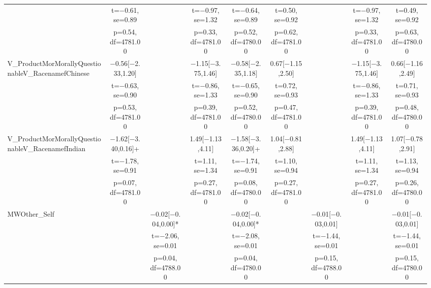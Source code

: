 \documentclass[]{report}
\begin{document}
\begin{table}
{\begin{tabular}[t]{lcccccccc}
		& t=\num{-0.61}, se=\num{0.89} &  & t=\num{-0.97}, se=\num{1.32} & t=\num{-0.64}, se=\num{0.89} & t=\num{0.50}, se=\num{0.92} &  & t=\num{-0.97}, se=\num{1.32} & t=\num{0.49}, se=\num{0.92}\\
		& p=\num{0.54}, df=\num{4781.00} &  & p=\num{0.33}, df=\num{4781.00} & p=\num{0.52}, df=\num{4780.00} & p=\num{0.62}, df=\num{4781.00} &  & p=\num{0.33}, df=\num{4781.00} & p=\num{0.63}, df=\num{4780.00}\\
		V\_ProductMorMorallyQuestionableV\_RacenamefChinese & \num{-0.56}[\num{-2.33},\num{1.20}] &  & \num{-1.15}[\num{-3.75},\num{1.46}] & \num{-0.58}[\num{-2.35},\num{1.18}] & \num{0.67}[\num{-1.15},\num{2.50}] &  & \num{-1.15}[\num{-3.75},\num{1.46}] & \num{0.66}[\num{-1.16},\num{2.49}]\\
		& t=\num{-0.63}, se=\num{0.90} &  & t=\num{-0.86}, se=\num{1.33} & t=\num{-0.65}, se=\num{0.90} & t=\num{0.72}, se=\num{0.93} &  & t=\num{-0.86}, se=\num{1.33} & t=\num{0.71}, se=\num{0.93}\\
		& p=\num{0.53}, df=\num{4781.00} &  & p=\num{0.39}, df=\num{4781.00} & p=\num{0.52}, df=\num{4780.00} & p=\num{0.47}, df=\num{4781.00} &  & p=\num{0.39}, df=\num{4781.00} & p=\num{0.48}, df=\num{4780.00}\\
		V\_ProductMorMorallyQuestionableV\_RacenamefIndian & \num{-1.62}[\num{-3.40},\num{0.16}]+ &  & \num{1.49}[\num{-1.13},\num{4.11}] & \num{-1.58}[\num{-3.36},\num{0.20}]+ & \num{1.04}[\num{-0.81},\num{2.88}] &  & \num{1.49}[\num{-1.13},\num{4.11}] & \num{1.07}[\num{-0.78},\num{2.91}]\\
		& t=\num{-1.78}, se=\num{0.91} &  & t=\num{1.11}, se=\num{1.34} & t=\num{-1.74}, se=\num{0.91} & t=\num{1.10}, se=\num{0.94} &  & t=\num{1.11}, se=\num{1.34} & t=\num{1.13}, se=\num{0.94}\\
		& p=\num{0.07}, df=\num{4781.00} &  & p=\num{0.27}, df=\num{4781.00} & p=\num{0.08}, df=\num{4780.00} & p=\num{0.27}, df=\num{4781.00} &  & p=\num{0.27}, df=\num{4781.00} & p=\num{0.26}, df=\num{4780.00}\\
		MWOther\_Self &  & \num{-0.02}[\num{-0.04},\num{0.00}]* &  & \num{-0.02}[\num{-0.04},\num{0.00}]* &  & \num{-0.01}[\num{-0.03},\num{0.01}] &  & \num{-0.01}[\num{-0.03},\num{0.01}]\\
		&  & t=\num{-2.06}, se=\num{0.01} &  & t=\num{-2.08}, se=\num{0.01} &  & t=\num{-1.44}, se=\num{0.01} &  & t=\num{-1.44}, se=\num{0.01}\\
		&  & p=\num{0.04}, df=\num{4788.00} &  & p=\num{0.04}, df=\num{4780.00} &  & p=\num{0.15}, df=\num{4788.00} &  & p=\num{0.15}, df=\num{4780.00}\\

\end{tabular}}
\end{table}
\end{document}
